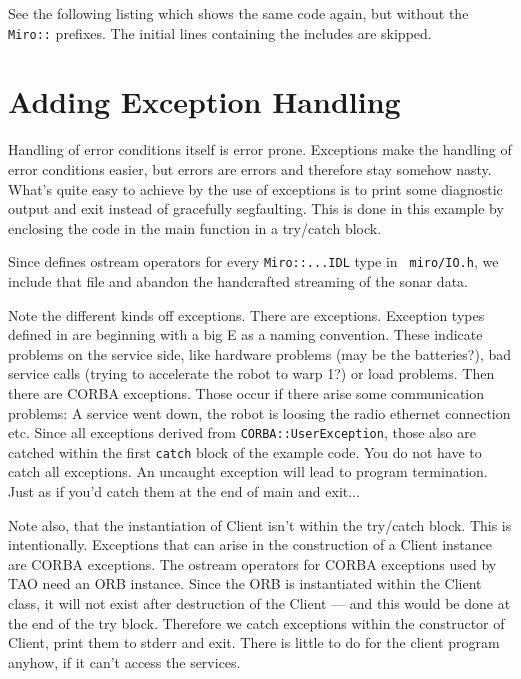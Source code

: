 See the following listing which shows the same code again, but without
the \lstinline!Miro::! prefixes. The initial lines containing the includes
are skipped.


\label{lst:SonarPoll2}


\section{Adding Exception Handling}

Handling of error conditions itself is error prone. Exceptions make
the handling of error conditions easier, but errors are errors and
therefore stay somehow nasty. What's quite easy to achieve by the use
of exceptions is to print some diagnostic output and exit instead of
gracefully segfaulting. This is done in this example by enclosing the
code in the main function in a try/catch block.

Since \miro defines ostream operators for every \lstinline!Miro::...IDL!
type in \lstinline! miro/IO.h!, we include that file and abandon the
handcrafted streaming of the sonar data.

Note the different kinds off exceptions. There are \miro
exceptions. Exception types defined in \miro are beginning with a
big E as a naming convention. These indicate problems on the
service side, like hardware problems (may be the batteries?), bad
service calls (trying to accelerate the robot to warp 1?) or load
problems. Then there are CORBA exceptions. Those occur if there
arise some communication problems: A service went down, the robot
is loosing the radio ethernet connection etc. Since all \miro
exceptions derived from \lstinline!CORBA::UserException!, those
also are catched within the first \lstinline!catch! block of the
example code. You do not have to catch all exceptions. An uncaught
exception will lead to program termination. Just as if you'd catch
them at the end of main and exit...

Note also, that the instantiation of Client isn't within the try/catch
block. This is intentionally. Exceptions that can arise in the
construction of a Client instance are CORBA exceptions. The ostream
operators for CORBA exceptions used by TAO need an ORB
instance. Since the ORB is instantiated within the Client class, it
will not exist after destruction of the Client --- and this would be
done at the end of the try block. Therefore we catch exceptions within
the constructor of Client, print them to stderr and exit. There is
little to do for the client program anyhow, if it can't access the
services.

